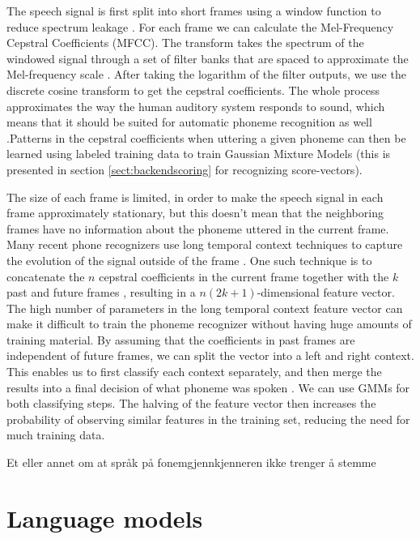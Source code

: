 The speech signal is first split into short frames using a window function to reduce spectrum leakage \cite[257]{talegk}. For each frame we can calculate the Mel-Frequency Cepstral Coefficients (MFCC). The transform takes the spectrum of the windowed signal through a set of filter banks that are spaced to approximate the Mel-frequency scale \cite[314]{talegk}. After taking the logarithm of the filter outputs, we use the discrete cosine transform to get the cepstral coefficients. The whole process approximates the way the human auditory system responds to sound, which means that it should be suited for automatic phoneme recognition as well \cite[314]{talegk}.Patterns in the cepstral coefficients when uttering a given phoneme can then be learned using labeled training data to train Gaussian Mixture Models (this is presented in section \ref{sect:backendscoring} for recognizing score-vectors).

The size of each frame is limited, in order to make the speech signal in each frame approximately stationary, but this doesn't mean that the neighboring frames have no information about the phoneme uttered in the current frame. Many recent phone recognizers use long temporal context techniques to capture the evolution of the signal outside of the frame \cite[p. 8]{butphnrec}. One such technique is to concatenate the $n$ cepstral coefficients in the current frame together with the $k$ past and future frames \cite[9]{butphnrec}, resulting in a $n(2k+1)$-dimensional feature vector. The high number of parameters in the long temporal context feature vector can make it difficult to train the phoneme recognizer without having huge amounts of training material. By assuming that the coefficients in past frames are independent of future frames, we can split the vector into a left and right context. This enables us to first classify each context separately, and then merge the results into a final decision of what phoneme was spoken \cite[p. 36]{butphnrec}. We can use GMMs for both classifying steps. The halving of the feature vector then increases the probability of observing similar features in the training set, reducing the need for much training data.


Et eller annet om at språk på fonemgjennkjenneren ikke trenger å stemme


\section{Language models}
\label{sect:basiclangmodel}

